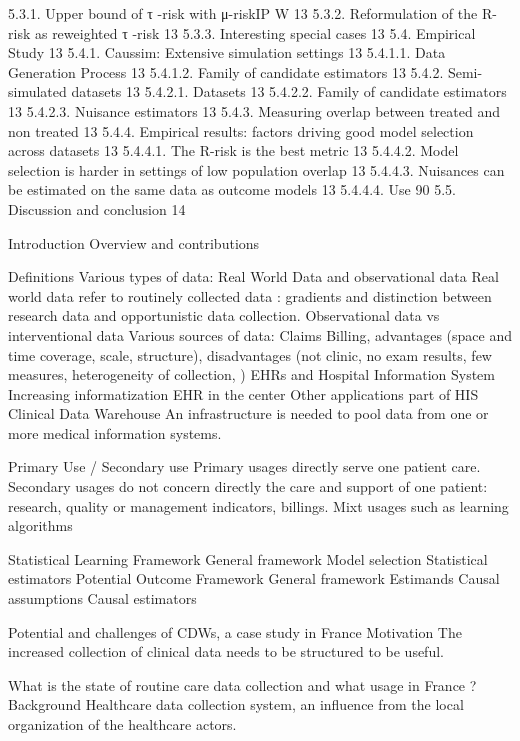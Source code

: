 5.3.1. Upper bound of τ -risk with μ-riskIP W	13
5.3.2. Reformulation of the R-risk as reweighted τ -risk	13
5.3.3. Interesting special cases	13
5.4. Empirical Study	13
5.4.1. Caussim: Extensive simulation settings	13
5.4.1.1. Data Generation Process	13
5.4.1.2. Family of candidate estimators	13
5.4.2. Semi-simulated datasets	13
5.4.2.1. Datasets	13
5.4.2.2. Family of candidate estimators	13
5.4.2.3. Nuisance estimators	13
5.4.3. Measuring overlap between treated and non treated	13
5.4.4. Empirical results: factors driving good model selection across datasets	13
5.4.4.1. The R-risk is the best metric	13
5.4.4.2. Model selection is harder in settings of low population overlap	13
5.4.4.3. Nuisances can be estimated on the same data as outcome models	13
5.4.4.4. Use 90%
5.5. Discussion and conclusion	14

Introduction
Overview and contributions

Definitions
Various types of data: Real World Data and observational data
Real world data refer to routinely collected data : gradients and distinction between research data and opportunistic data collection.
Observational data vs interventional data
Various sources of data:
Claims
Billing, advantages (space and time coverage, scale, structure), disadvantages (not clinic, no exam results, few measures, heterogeneity of collection, )
EHRs and Hospital Information System
Increasing informatization
EHR in the center
Other applications part of HIS
Clinical Data Warehouse
An infrastructure is needed to pool data from one or more medical information systems.

Primary Use / Secondary use
Primary usages directly serve one patient care.
Secondary usages do not concern directly the care and support of one patient: research, quality or management indicators, billings.
Mixt usages such as learning algorithms

Statistical Learning Framework
General framework
Model selection
Statistical estimators
Potential Outcome Framework
General framework
Estimands
Causal assumptions
Causal estimators

Potential and challenges of CDWs, a case study in France
Motivation
The increased collection of clinical data needs to be structured to be useful.

What is the state of routine care data collection and what usage in France ?
Background
Healthcare data collection system, an influence from the local organization of the healthcare actors.


